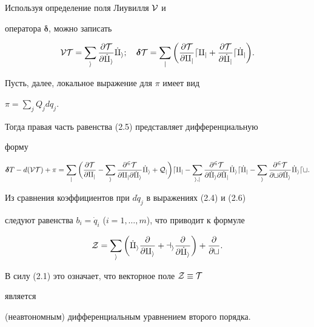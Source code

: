 \begin{pf} 


Используя определение поля Лиувилля $\cal V$ и 


оператора $\boldsymbol \delta$, можно записать 


$$ 


\cal V T=\sum_i\frac{\partial T}{\partial\Dot q_i}\Dot q_i;\quad 


\boldsymbol \delta T=\sum_j\bigg( 


\frac{\partial T}{\partial q_j}d q_j+ 


\frac{\partial T}{\partial\Dot q_j}d\Dot q_j\bigg). 


$$ 


Пусть, далее, локальное выражение для $\pi$ имеет вид 


$\pi=\sum\limits_j Q_j d q_j$. 


Тогда правая часть равенства (2.5) представляет дифференциальную 


форму 


\begin{equation} 


\boldsymbol \delta T-d(\cal V T)+\pi=\sum_j\bigg( 


\frac{\partial T}{\partial q_j}-\sum_i 


\frac{\partial^2T}{\partial q_j\partial\Dot q_i}\Dot q_i+Q_j\bigg) 


d q_j-\sum_{i,j} 


\frac{\partial^2T}{\partial\Dot q_i\partial\Dot q_j} 


\Dot q_i d\Dot q_j-\sum_i 


\frac{\partial^2T}{\partial t\partial\Dot q_i}\Dot q_i dt. 


\end{equation} 


Из сравнения коэффициентов при $d\Dot q_j$ в выражениях (2.4) и (2.6) 


следуют равенства $b_i=\Dot q_i$ ($i=1,\dotsc,m$), что приводит к формуле 


\begin{equation} 


\cal Z=\sum_i\bigg(\Dot q_i 


\frac{\partial}{\partial q_i}+a_i 


\frac{\partial}{\partial\Dot q_i}\bigg)+ 


\frac{\partial}{\partial t}. 


\end{equation} 


 


В силу (2.1) это означает, что векторное поле $\cal Z\equiv\cal T$ 


является 


(неавтономным) дифференциальным уравнением второго порядка. 


\end{pf} 


